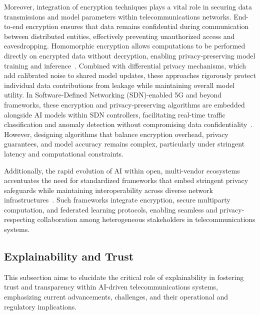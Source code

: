 \documentclass[sigconf]{acmart}
\begin{document}
Moreover, integration of encryption techniques plays a vital role in securing data transmissions and model parameters within telecommunications networks. End-to-end encryption ensures that data remains confidential during communication between distributed entities, effectively preventing unauthorized access and eavesdropping. Homomorphic encryption allows computations to be performed directly on encrypted data without decryption, enabling privacy-preserving model training and inference~\cite{ref50}. Combined with differential privacy mechanisms, which add calibrated noise to shared model updates, these approaches rigorously protect individual data contributions from leakage while maintaining overall model utility. In Software-Defined Networking (SDN)-enabled 5G and beyond frameworks, these encryption and privacy-preserving algorithms are embedded alongside AI models within SDN controllers, facilitating real-time traffic classification and anomaly detection without compromising data confidentiality~\cite{ref52}. However, designing algorithms that balance encryption overhead, privacy guarantees, and model accuracy remains complex, particularly under stringent latency and computational constraints.

Additionally, the rapid evolution of AI within open, multi-vendor ecosystems accentuates the need for standardized frameworks that embed stringent privacy safeguards while maintaining interoperability across diverse network infrastructures~\cite{ref48,ref52}. Such frameworks integrate encryption, secure multiparty computation, and federated learning protocols, enabling seamless and privacy-respecting collaboration among heterogeneous stakeholders in telecommunications systems.

\subsection{Explainability and Trust}

This subsection aims to elucidate the critical role of explainability in fostering trust and transparency within AI-driven telecommunications systems, emphasizing current advancements, challenges, and their operational and regulatory implications.
\end{document}

